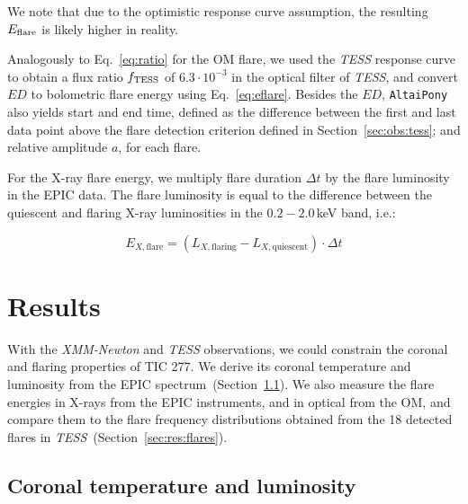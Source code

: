 \documentclass[twocolumn]{aastex631}
\begin{document}
We note that due to the optimistic response curve assumption, the resulting $E_{\rm flare}$ is likely higher in reality.


Analogously to Eq.~\ref{eq:ratio} for the OM flare, we used the \textit{TESS} response curve to obtain a flux ratio $f_{\rm TESS}$ of $6.3\cdot10^{-3}$ in the optical filter of \textit{TESS}, and convert $ED$ to bolometric flare energy using Eq.~\ref{eq:eflare}. Besides the $ED$, \texttt{AltaiPony} also yields start and end time, defined as the difference between the first and last data point above the flare detection criterion defined in Section~\ref{sec:obs:tess}; and relative amplitude $a$, for each flare.

For the X-ray flare energy, we multiply flare duration $\Delta t$ by the flare luminosity in the EPIC data. The flare luminosity is equal to the difference between the quiescent and flaring X-ray luminosities in the $0.2-2.0\,$keV band, i.e.:

\begin{equation}
    E_{X, \mathrm{flare}} = \left(L_{X,\mathrm{flaring}} -  L_{X,\mathrm{quiescent}}\right) \cdot \Delta t
    \label{eq:xrayflare}
\end{equation}

\section{Results}
\label{sec:results}
With the \textit{XMM-Newton} and \textit{TESS} observations, we could constrain the coronal and flaring properties of TIC 277. We derive its coronal temperature and luminosity from the EPIC spectrum~(Section~\ref{sec:res:XrayTL}). We also measure the flare energies in X-rays from the EPIC instruments, and in optical from the OM, and compare them to the flare frequency distributions obtained from the 18 detected flares in \textit{TESS}~(Section~\ref{sec:res:flares}).


\subsection{Coronal temperature and luminosity}
\label{sec:res:XrayTL}
\end{document}
